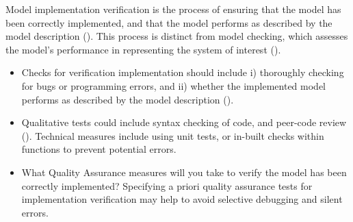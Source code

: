 \documentclass[
]{article}
\providecommand{\tightlist}{%
  \setlength{\itemsep}{0pt}\setlength{\parskip}{0pt}}
\begin{document}
\begin{tcolorbox}[enhanced jigsaw, opacitybacktitle=0.6, bottomrule=.15mm, leftrule=.75mm, rightrule=.15mm, colbacktitle=quarto-callout-note-color!10!white, toprule=.15mm, titlerule=0mm, left=2mm, colframe=quarto-callout-note-color-frame, breakable, title=\textcolor{quarto-callout-note-color}{\faInfo}\hspace{0.5em}{Explanation \& Examples}, opacityback=0, coltitle=black, bottomtitle=1mm, colback=white, toptitle=1mm, arc=.35mm]

Model implementation verification is the process of ensuring that the
model has been correctly implemented, and that the model performs as
described by the model description (). This process is distinct from model checking, which
assesses the model's performance in representing the system of interest
().

\begin{itemize}
\tightlist
\item
  Checks for verification implementation should include i) thoroughly
  checking for bugs or programming errors, and ii) whether the
  implemented model performs as described by the model description
  ().
\item
  Qualitative tests could include syntax checking of code, and peer-code
  review (). Technical
  measures include using unit tests, or in-built checks within functions
  to prevent potential errors.
\end{itemize}

\end{tcolorbox}

\begin{tcolorbox}[enhanced jigsaw, opacitybacktitle=0.6, bottomrule=.15mm, leftrule=.75mm, rightrule=.15mm, colbacktitle=quarto-callout-caution-color!10!white, toprule=.15mm, titlerule=0mm, left=2mm, colframe=quarto-callout-caution-color-frame, breakable, title=\textcolor{quarto-callout-caution-color}{\faFire}\hspace{0.5em}{Preregistration Item}, opacityback=0, coltitle=black, bottomtitle=1mm, colback=white, toptitle=1mm, arc=.35mm]

\begin{itemize}
\tightlist
\item[$\square$]
  What Quality Assurance measures will you take to verify the model has
  been correctly implemented? Specifying a priori quality assurance
  tests for implementation verification may help to avoid selective
  debugging and silent errors.
\end{itemize}

\end{tcolorbox}
\end{document}
